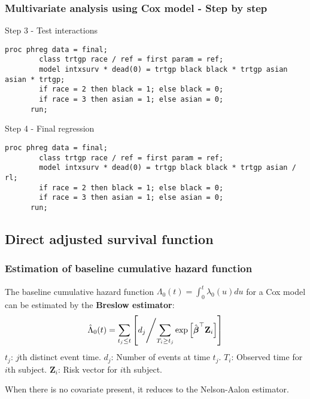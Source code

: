 \documentclass[11pt, aspectratio = 169]{beamer}
\begin{document}
\begin{frame}[fragile]
  \frametitle{Multivariate analysis using Cox model - Step by step}
  \begin{block}{Step 3 - Test interactions}
    \begin{lstlisting}[gobble = 6]
      proc phreg data = final;
        class trtgp race / ref = first param = ref;
        model intxsurv * dead(0) = trtgp black black * trtgp asian asian * trtgp;
        if race = 2 then black = 1; else black = 0;
        if race = 3 then asian = 1; else asian = 0;
      run;
    \end{lstlisting}
  \end{block}
  \begin{block}{Step 4 - Final regression}
    \begin{lstlisting}[gobble = 6]
      proc phreg data = final;
        class trtgp race / ref = first param = ref;
        model intxsurv * dead(0) = trtgp black black * trtgp asian / rl;
        if race = 2 then black = 1; else black = 0;
        if race = 3 then asian = 1; else asian = 0;
      run;
    \end{lstlisting}
  \end{block}
\end{frame}

\subsection{Direct adjusted survival function}

\begin{frame}
  \frametitle{Estimation of baseline cumulative hazard function}
  The baseline cumulative hazard function $\Lambda_{0}(t) = \int_0^t \lambda_0(u)du$ for a Cox model can be estimated by the \textbf{Breslow estimator}\footnotemark:
  \begin{equation*}
    \hat{\Lambda}_{0}(t) = \sum_{t_j \le t} \left[d_j \middle/ \sum_{T_i \ge t_j} \exp\left[\hat{\boldsymbol{\beta}}^\top\mathbf{Z}_i\right] \right]
  \end{equation*}
  $t_j$: $j$th distinct event time.
  $d_j$: Number of events at time $t_j$.
  $T_i$: Observed time for $i$th subject.
  $\mathbf{Z}_i$: Risk vector for $i$th subject.
  
  When there is no covariate present, it reduces to the Nelson-Aalon estimator.
\end{frame}
\end{document}
